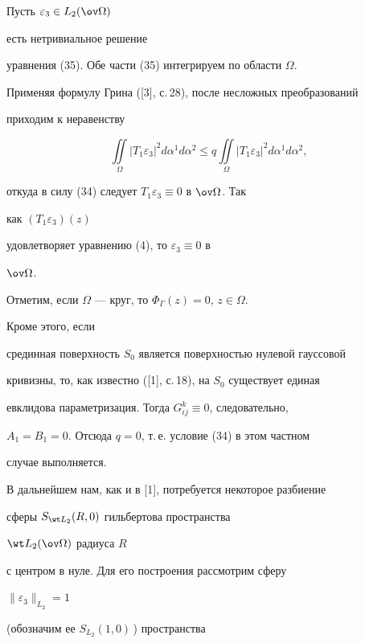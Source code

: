 \begin{pf} Пусть $\varepsilon_3\in L_2(\ov\Omega)$ 


есть нетривиальное решение 


уравнения (35). Обе части (35) интегрируем по области $\Omega$. 


Применяя формулу Грина ([3], с.\,28), после несложных преобразований 


приходим к неравенству 


$$ 


\iint\limits_\Omega|T_1\varepsilon_3|^2d\alpha^1d\alpha^2\le 


q\iint\limits_\Omega|T_1\varepsilon_3|^2d\alpha^1d\alpha^2, 


$$ 


откуда в силу (34) следует $T_1\varepsilon_3\equiv0$ в $\ov\Omega$. Так 


как $(T_1\varepsilon_3)(z)$ 


удовлетворяет уравнению (4), то $\varepsilon_3\equiv 0$ в 


$\ov\Omega$. 


\end{pf} 


 


Отметим, если $\Omega$ --- круг, то $\Phi_\Gamma(z)=0$, $z\in\Omega$. 


Кроме этого, если 


срединная поверхность $S_0$ является поверхностью нулевой гауссовой 


кривизны, то, как известно ([1], с.\,18), на $S_0$ существует единая 


евклидова параметризация. Тогда $G^k_{ij}\equiv 0$, следовательно, 


$A_1=B_1=0$. Отсюда $q=0$, т.\,е. условие (34) в этом частном 


случае выполняется. 


 


В дальнейшем нам, как и в [1], потребуется некоторое разбиение 


сферы $S_{\wt L_2}(R,0)$ гильбертова пространства 


$\wt L_2(\ov\Omega)$ радиуса $R$ 


с центром в нуле. Для его построения рассмотрим сферу \linebreak


$\|\varepsilon_3\|_{L_2}=1$ 


(обозначим ее $S_{L_2}(1,0)$\,) пространства 



